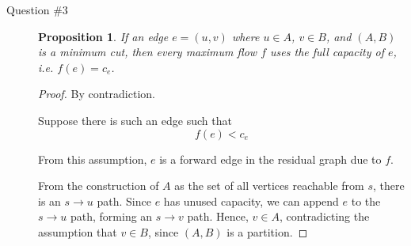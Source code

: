 \documentclass[letterpaper,11pt]{article}
\newtheorem{proposition}{Proposition}
\begin{document}
\begin{description}
    \item[Question \#3]

        \begin{proposition}
            If an edge $e = (u, v)$ where $u \in A$, $v \in B$, and $(A, B)$ is
            a minimum cut, then every maximum flow $f$ uses the full capacity
            of $e$, i.e. $f(e) = c_e$.
        \end{proposition}

        \begin{proof}
            By contradiction.

            Suppose there is such an edge such that
            \begin{equation}
                f(e) < c_e
                \label{eq:max-flow-contradiction}
            \end{equation}

            From this assumption, $e$ is a forward edge in the residual graph
            due to $f$.

            From the construction of $A$ as the set of all vertices reachable
            from $s$, there is an $s \to u$ path. Since $e$ has unused
            capacity, we can append $e$ to the $s \to u$ path, forming an $s
            \to v$ path. Hence, $v \in A$, contradicting the assumption that
            $v \in B$, since $(A, B)$ is a partition.
        \end{proof}

\end{description}
\end{document}
